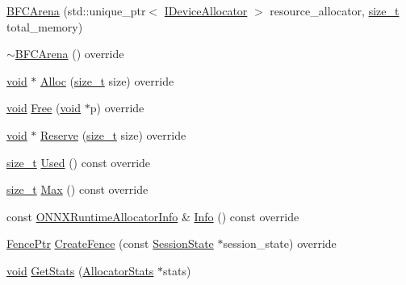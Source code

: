\begin{DoxyCompactItemize}
\item 
\mbox{\hyperlink{classonnxruntime_1_1BFCArena_aa8ed4d9dbe83542b0d1a97050edc9fe5}{B\+F\+C\+Arena}} (std\+::unique\+\_\+ptr$<$ \mbox{\hyperlink{classonnxruntime_1_1IDeviceAllocator}{I\+Device\+Allocator}} $>$ resource\+\_\+allocator, \mbox{\hyperlink{mlasi_8h_a503efbc1c6e50825320ad909366b78ab}{size\+\_\+t}} total\+\_\+memory)
\item 
\mbox{\hyperlink{classonnxruntime_1_1BFCArena_ac4d8fcafd40fdc8bbb211cbb8fdd1521}{$\sim$\+B\+F\+C\+Arena}} () override
\item 
\mbox{\hyperlink{mlasi_8h_a88f941d423cb2a819b70a1358982b1a6}{void}} $\ast$ \mbox{\hyperlink{classonnxruntime_1_1BFCArena_a1e4bda05da04e05e5a9a58c3839e2a14}{Alloc}} (\mbox{\hyperlink{mlasi_8h_a503efbc1c6e50825320ad909366b78ab}{size\+\_\+t}} size) override
\item 
\mbox{\hyperlink{mlasi_8h_a88f941d423cb2a819b70a1358982b1a6}{void}} \mbox{\hyperlink{classonnxruntime_1_1BFCArena_a92b868aa0f335eafb2ae3542aa87b569}{Free}} (\mbox{\hyperlink{mlasi_8h_a88f941d423cb2a819b70a1358982b1a6}{void}} $\ast$p) override
\item 
\mbox{\hyperlink{mlasi_8h_a88f941d423cb2a819b70a1358982b1a6}{void}} $\ast$ \mbox{\hyperlink{classonnxruntime_1_1BFCArena_a3c5f633150f1f2f4003ee57757c10f11}{Reserve}} (\mbox{\hyperlink{mlasi_8h_a503efbc1c6e50825320ad909366b78ab}{size\+\_\+t}} size) override
\item 
\mbox{\hyperlink{mlasi_8h_a503efbc1c6e50825320ad909366b78ab}{size\+\_\+t}} \mbox{\hyperlink{classonnxruntime_1_1BFCArena_a4e6bd70a40977a1c9db618daa937f9f8}{Used}} () const override
\item 
\mbox{\hyperlink{mlasi_8h_a503efbc1c6e50825320ad909366b78ab}{size\+\_\+t}} \mbox{\hyperlink{classonnxruntime_1_1BFCArena_a86661567f79140806c715e5abe56040a}{Max}} () const override
\item 
const \mbox{\hyperlink{structONNXRuntimeAllocatorInfo}{O\+N\+N\+X\+Runtime\+Allocator\+Info}} \& \mbox{\hyperlink{classonnxruntime_1_1BFCArena_acf4fc8182c636a16d62e80cf051da0e2}{Info}} () const override
\item 
\mbox{\hyperlink{namespaceonnxruntime_a42d52aa37e4dba8c02178f81eda99eeb}{Fence\+Ptr}} \mbox{\hyperlink{classonnxruntime_1_1BFCArena_a2933ac1d2a3db5b2b4f242eb12d64721}{Create\+Fence}} (const \mbox{\hyperlink{classonnxruntime_1_1SessionState}{Session\+State}} $\ast$session\+\_\+state) override
\item 
\mbox{\hyperlink{mlasi_8h_a88f941d423cb2a819b70a1358982b1a6}{void}} \mbox{\hyperlink{classonnxruntime_1_1BFCArena_a3ca0c91d197bf7f3f2ee0859c62a44e5}{Get\+Stats}} (\mbox{\hyperlink{structonnxruntime_1_1AllocatorStats}{Allocator\+Stats}} $\ast$stats)

\end{DoxyCompactItemize}
